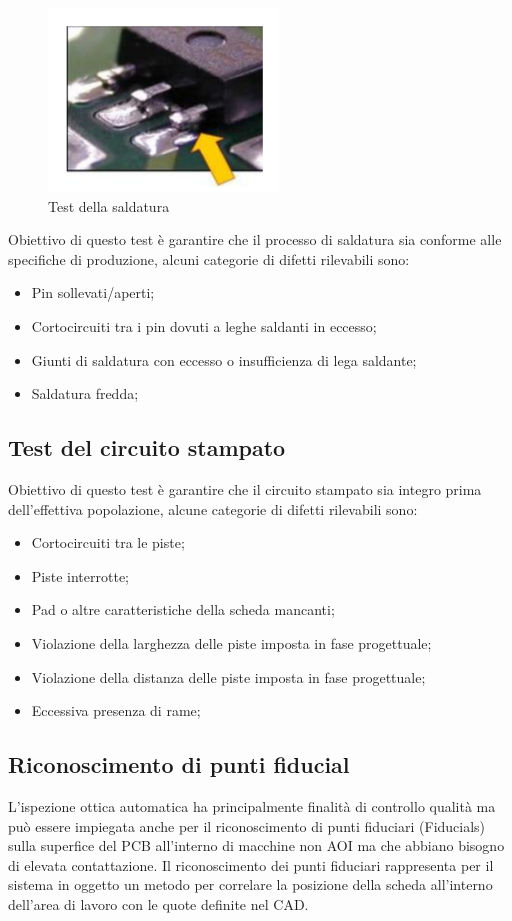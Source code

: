 \begin{figure}[!ht]
\centering
\includegraphics[width=.4\textwidth]{img/saldatura.png}
\caption{Test della saldatura}
\label{fig:presenza}
\end{figure}

Obiettivo di questo test è garantire che il processo di saldatura sia conforme alle specifiche di produzione,
alcuni categorie di difetti rilevabili sono:
\begin{itemize}
\item Pin sollevati/aperti;
\item Cortocircuiti tra i pin dovuti a leghe saldanti in eccesso;
\item Giunti di saldatura con eccesso o insufficienza di lega saldante;
\item Saldatura fredda;
\end{itemize}

\subsection{Test del circuito stampato}
Obiettivo di questo test è garantire che il circuito stampato sia integro prima dell’effettiva popolazione,
alcune categorie di difetti rilevabili sono:
\begin{itemize}
\item Cortocircuiti tra le piste;
\item Piste interrotte;
\item Pad o altre caratteristiche della scheda mancanti;
\item Violazione della larghezza delle piste imposta in fase progettuale;
\item Violazione della distanza delle piste imposta in fase progettuale;
\item Eccessiva presenza di rame;
\end{itemize}

\subsection{Riconoscimento di punti fiducial}
L’ispezione ottica automatica ha principalmente finalità di controllo qualità ma può essere impiegata
anche per il riconoscimento di punti fiduciari (Fiducials) sulla superfice del PCB all’interno di macchine non AOI ma che abbiano bisogno di elevata contattazione. Il riconoscimento dei punti fiduciari rappresenta
per il sistema in oggetto un metodo per correlare la posizione della scheda all’interno dell’area di lavoro
con le quote definite nel CAD.

